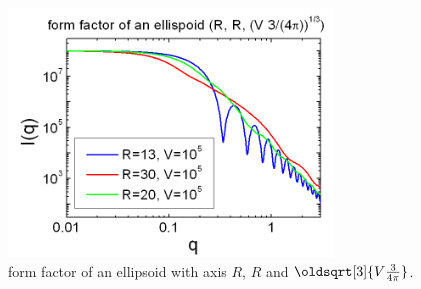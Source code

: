 \begin{figure}[htb]
\begin{center}
\includegraphics[width=0.768\textwidth]{../images/form_factor/Ellipsoid/ellipsoid_i.png}
\end{center}
\caption{form factor of an ellipsoid with axis $R$, $R$ and
$\oldsqrt[3]{V\frac{3}{4\pi}}$.} \label{fig:I_ellipsoid_i}
\end{figure}

\clearpage
